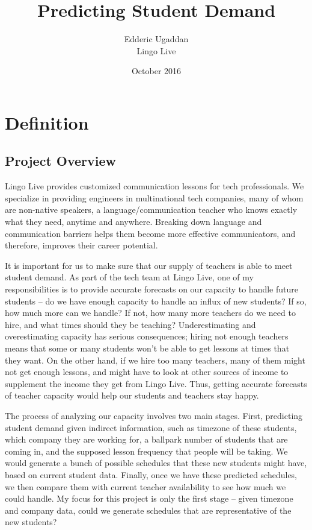 \documentclass[oneside]{article}
\begin{document}
\title{Predicting Student Demand}
\author{        Edderic Ugaddan \\
                Lingo Live
}
\date{October 2016}



\maketitle
\tableofcontents
\newpage


\section{Definition}

\subsection{Project Overview}
Lingo Live provides customized communication lessons for tech professionals.
We specialize in providing engineers in multinational tech companies, many of
whom are non-native speakers, a language/communication teacher who knows
exactly what they need, anytime and anywhere. Breaking down language and
communication barriers helps them become more effective communicators, and
therefore, improves their career potential.

It is important for us to make sure that our supply of teachers is able to meet
student demand. As part of the tech team at Lingo Live, one of my
responsibilities is to provide accurate forecasts on our capacity to handle
future students -- do we have enough capacity to handle an influx of new
students? If so, how much more can we handle? If not, how many more teachers do
we need to hire, and what times should they be teaching? Underestimating and
overestimating capacity has serious consequences; hiring not enough teachers
means that some or many students won't be able to get lessons at times that
they want. On the other hand, if we hire too many teachers, many of them might
not get enough lessons, and might have to look at other sources of income to
supplement the income they get from Lingo Live. Thus, getting accurate
forecasts of teacher capacity would help our students and teachers stay happy.

The process of analyzing our capacity involves two main stages. First,
predicting student demand given indirect information, such as timezone of these
students, which company they are working for, a ballpark number of students
that are coming in, and the supposed lesson frequency that people will be
taking.  We would generate a bunch of possible schedules that these new
students might have, based on current student data. Finally, once we have these
predicted schedules, we then compare them with current teacher availability to
see how much we could handle. My focus for this project is only the first stage
-- given timezone and company data, could we generate schedules that are
representative of the new students?
\end{document}
